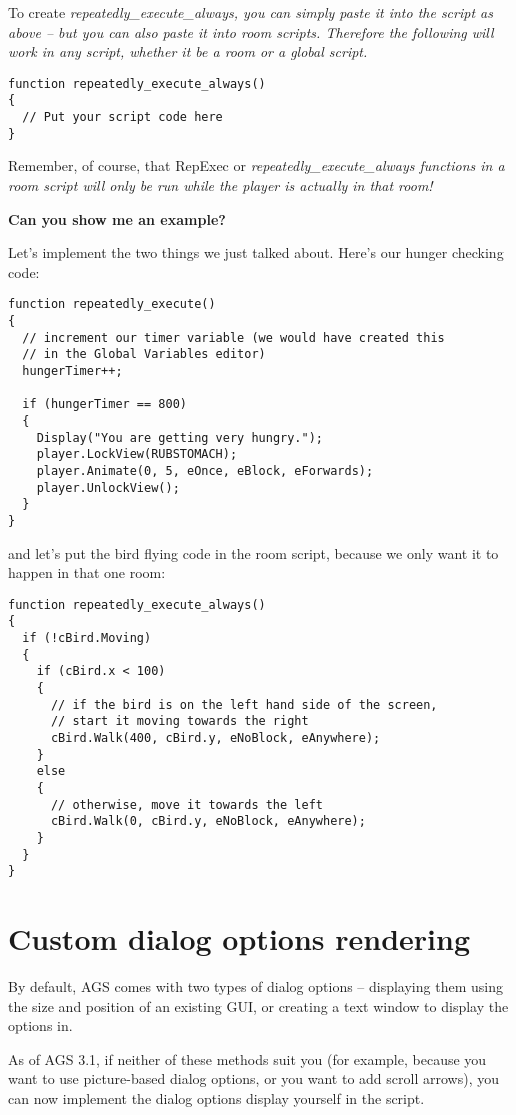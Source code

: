 To create \it{repeatedly_execute_always}, you can simply paste it into the script as above -- but
you can also paste it into room scripts. Therefore the following will work in any script, whether
it be a room or a global script.
\begin{verbatim}
function repeatedly_execute_always()
{
  // Put your script code here
}
\end{verbatim}
Remember, of course, that RepExec or \it{repeatedly_execute_always} functions in a room script
will only be run while the player is actually in that room!

\bf{Can you show me an example?}

Let's implement the two things we just talked about. Here's our hunger checking code:
\begin{verbatim}
function repeatedly_execute()
{
  // increment our timer variable (we would have created this
  // in the Global Variables editor)
  hungerTimer++;

  if (hungerTimer == 800)
  {
    Display("You are getting very hungry.");
    player.LockView(RUBSTOMACH);
    player.Animate(0, 5, eOnce, eBlock, eForwards);
    player.UnlockView();
  }
}
\end{verbatim}
and let's put the bird flying code in the room script, because we only want it to happen in that one room:
\begin{verbatim}
function repeatedly_execute_always()
{
  if (!cBird.Moving)
  {
    if (cBird.x < 100)
    {
      // if the bird is on the left hand side of the screen,
      // start it moving towards the right
      cBird.Walk(400, cBird.y, eNoBlock, eAnywhere);
    }
    else
    {
      // otherwise, move it towards the left
      cBird.Walk(0, cBird.y, eNoBlock, eAnywhere);
    }
  }
}
\end{verbatim}


\section{Custom dialog options rendering}\label{CustomDialogOptions}%

By default, AGS comes with two types of dialog options -- displaying them using the size
and position of an existing GUI, or creating a text window to display the options in.

As of AGS 3.1, if neither of these methods suit you (for example, because you want to
use picture-based dialog options, or you want to add scroll arrows), you can now implement
the dialog options display yourself in the script.

